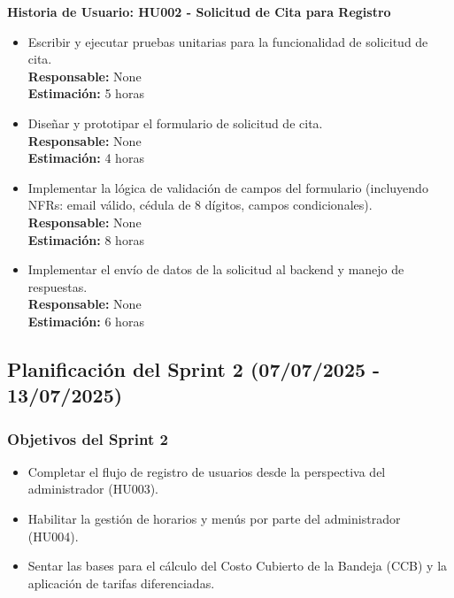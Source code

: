 \documentclass[12pt]{article}
\begin{document}
\textbf{Historia de Usuario: HU002 - Solicitud de Cita para Registro}
\begin{itemize}
	\item Escribir y ejecutar pruebas unitarias para la funcionalidad de solicitud de cita. \\
	\textbf{Responsable:} None \\
	\textbf{Estimación:} 5 horas
	\item Diseñar y prototipar el formulario de solicitud de cita. \\
	\textbf{Responsable:} None \\
	\textbf{Estimación:} 4 horas
	\item Implementar la lógica de validación de campos del formulario (incluyendo NFRs: email válido, cédula de 8 dígitos, campos condicionales). \\
	\textbf{Responsable:} None \\
	\textbf{Estimación:} 8 horas
	\item Implementar el envío de datos de la solicitud al backend y manejo de respuestas. \\
	\textbf{Responsable:} None \\
	\textbf{Estimación:} 6 horas
\end{itemize}

\subsection{Planificación del Sprint 2 (07/07/2025 - 13/07/2025)}

\subsubsection{Objetivos del Sprint 2}
\begin{itemize}
	\item Completar el flujo de registro de usuarios desde la perspectiva del administrador (HU003).
	\item Habilitar la gestión de horarios y menús por parte del administrador (HU004).
	\item Sentar las bases para el cálculo del Costo Cubierto de la Bandeja (CCB) y la aplicación de tarifas diferenciadas.
\end{itemize}
\end{document}
